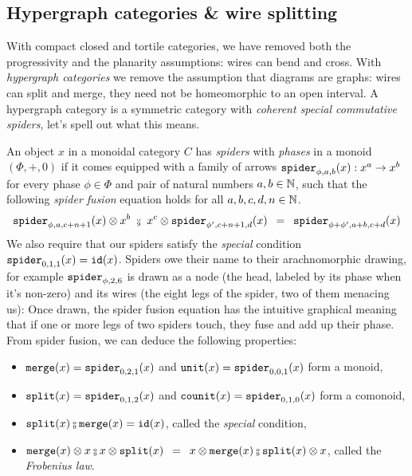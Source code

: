
\subsection{Hypergraph categories \& wire splitting} \label{subsection:hypergraph}

With compact closed and tortile categories, we have removed both the progressivity and the planarity assumptions: wires can bend and cross.
With \emph{hypergraph categories} we remove the assumption that diagrams are graphs: wires can split and merge, they need not be homeomorphic to an open interval.
A hypergraph category is a symmetric category with \emph{coherent special commutative spiders}, let's spell out what this means.

An object $x$ in a monoidal category $C$ has \emph{spiders} with \emph{phases} in a monoid $(\Phi, +, 0)$ if it comes equipped with a family of arrows $\mathtt{spider}_{\phi, a, b}(x) : x^a \to x^b$ for every phase $\phi \in \Phi$ and pair of natural numbers $a, b \in \mathbb{N}$, such that the following \emph{spider fusion} equation holds for all $a, b, c, d, n \in \mathbb{N}$.
$$\spider_{\phi, a, c + n + 1}(x) \otimes x^b
\ \fcmp \ x^c \otimes \spider_{\phi', c + n + 1, d}(x)
\s = \s \spider_{\phi + \phi', a + b, c + d}(x)$$
We also require that our spiders satisfy the \emph{special} condition $\mathtt{spider}_{0, 1, 1}(x) = \mathtt{id}(x)$.
Spiders owe their name to their arachnomorphic drawing, for example $\mathtt{spider}_{\phi, 2, 6}$ is drawn as a node (the head, labeled by its phase when it's non-zero) and its wires (the eight legs of the spider, two of them menacing us):
Once drawn, the spider fusion equation has the intuitive graphical meaning that if one or more legs of two spiders touch, they fuse and add up their phase.
From spider fusion, we can deduce the following properties:
\begin{itemize}
\item $\mathtt{merge}(x) = \mathtt{spider}_{0, 2, 1}(x)$ and $\mathtt{unit}(x) = \mathtt{spider}_{0, 0, 1}(x)$ form a monoid,
\begin{center}
\hfill
{}
\end{center}
\item $\mathtt{split}(x) = \mathtt{spider}_{0, 1, 2}(x)$ and $\mathtt{counit}(x) = \mathtt{spider}_{0, 1, 0}(x)$ form a comonoid,
\begin{center}
\hfill
{}
\end{center}
\item $\ttsplit(x) \fcmp \merge(x) = \id(x)$, called the \emph{special} condition,
\item $\merge(x) \otimes x \fcmp x \otimes \ttsplit(x) \s = \s x \otimes \merge(x) \fcmp \ttsplit(x) \otimes x$, called the \emph{Frobenius law}.
\end{itemize}
